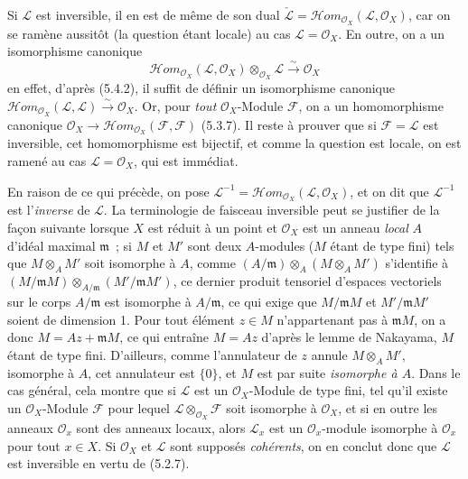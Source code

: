 \begin{env}[5.4.3]
Si $\mathcal{L}$ est inversible, il en est de même de son dual
$\check{\mathcal{L}}=
\mathcal{H}\!om_{\mathcal{O}_X}(\mathcal{L},\mathcal{O}_X)$, car on se ramène
aussitôt (la question étant locale) au cas $\mathcal{L}=\mathcal{O}_X$. En
outre, on a un isomorphisme canonique
\[
  \mathcal{H}\!om_{\mathcal{O}_X}(\mathcal{L},\mathcal{O}_X)
  \otimes_{\mathcal{O}_X}\mathcal{L}
  \xrightarrow{\sim}
  \mathcal{O}_X
  \tag{5.4.3.1}\label{0.5.4.3.1-fr}
\]
en effet, d'après (5.4.2), il suffit de définir un isomorphisme canonique
$\mathcal{H}\!om_{\mathcal{O}_X}(\mathcal{L},\mathcal{L})
\xrightarrow{\sim}\mathcal{O}_X$. Or, pour \emph{tout}
$\mathcal{O}_X$-Module $\mathcal{F}$, on a un homomorphisme canonique
$\mathcal{O}_X\longrightarrow
\mathcal{H}\!om_{\mathcal{O}_X}(\mathcal{F},\mathcal{F})$ (5.3.7). Il reste
à prouver que si $\mathcal{F}=\mathcal{L}$ est inversible, cet homomorphisme
est bijectif, et comme la question est locale, on est ramené au cas
$\mathcal{L}=\mathcal{O}_X$, qui est immédiat.

En raison de ce qui précède, on pose
$\mathcal{L}^{-1}=
\mathcal{H}\!om_{\mathcal{O}_X}(\mathcal{L},\mathcal{O}_X)$, et on dit que
$\mathcal{L}^{-1}$ est l'\emph{inverse} de $\mathcal{L}$. La terminologie de
\og faisceau inversible\fg{} peut se justifier de la façon suivante lorsque $X$ est
réduit à un point et $\mathcal{O}_X$ est un anneau \emph{local} $A$ d'idéal
maximal $\mathfrak m$~; si $M$ et $M'$ sont deux $A$-modules ($M$ étant de
type fini) tels que $M\otimes_A M'$ soit isomorphe à $A$, comme
$(A/\mathfrak m)\otimes_A(M\otimes_A M')$ s'identifie à
$(M/\mathfrak mM)\otimes_{A/\mathfrak m}(M'/\mathfrak mM')$, ce dernier
produit tensoriel d'espaces vectoriels sur le corps $A/\mathfrak m$ est
isomorphe à $A/\mathfrak m$, ce qui exige que $M/\mathfrak mM$ et
$M'/\mathfrak mM'$ soient de dimension 1. Pour tout élément $z\in M$
n'appartenant pas à $\mathfrak mM$, on a donc $M=Az+\mathfrak mM$, ce qui
entraîne $M=Az$ d'après le lemme de Nakayama, $M$ étant de type fini.
D'ailleurs, comme l'annulateur de $z$ annule $M\otimes_A M'$, isomorphe à
$A$, cet annulateur est $\{0\}$, et $M$ est par suite \emph{isomorphe à $A$}.
Dans le cas général, cela montre que si $\mathcal{L}$ est un
$\mathcal{O}_X$-Module de type fini, tel qu'il existe un
$\mathcal{O}_X$-Module $\mathcal{F}$ pour lequel
$\mathcal{L}\otimes_{\mathcal{O}_X}\mathcal{F}$ soit isomorphe à
$\mathcal{O}_X$, et si en outre les anneaux $\mathcal{O}_x$ sont des anneaux
locaux, alors $\mathcal{L}_x$ est un $\mathcal{O}_x$-module isomorphe à
$\mathcal{O}_x$ pour tout $x\in X$. Si $\mathcal{O}_X$ et $\mathcal{L}$ sont
supposés \emph{cohérents}, on en conclut donc que $\mathcal{L}$ est inversible
en vertu de (5.2.7).
\end{env}

